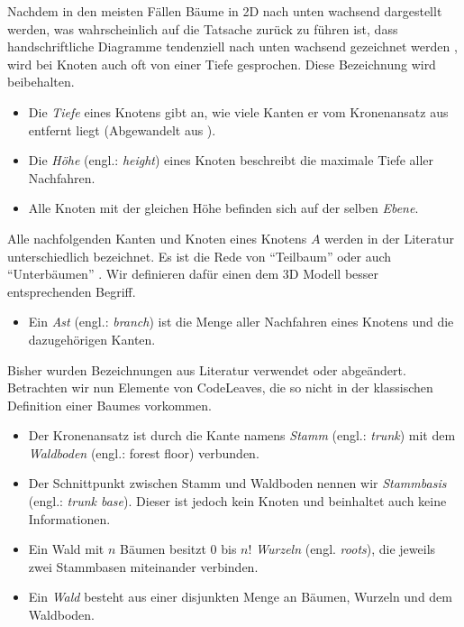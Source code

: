 Nachdem in den meisten Fällen Bäume in 2D nach unten wachsend dargestellt werden, was wahrscheinlich auf die Tatsache zurück zu führen ist, dass handschriftliche Diagramme tendenziell nach unten wachsend gezeichnet werden \cite{knuth1973fundamental}, wird bei Knoten auch oft von einer Tiefe gesprochen. Diese Bezeichnung wird beibehalten.

\begin{itemize}
  \item Die \textit{Tiefe} eines Knotens gibt an, wie viele Kanten er vom Kronenansatz aus entfernt liegt (Abgewandelt aus \cite{ernst2016grundkurs}).
  \item Die \textit{Höhe} (engl.: \textit{height}) eines Knoten beschreibt die maximale Tiefe aller Nachfahren.
  \item Alle Knoten mit der gleichen Höhe befinden sich auf der selben \textit{Ebene}.
\end{itemize}

Alle nachfolgenden Kanten und Knoten eines Knotens $A$ werden in der Literatur unterschiedlich bezeichnet. Es ist die Rede von "`Teilbaum"' \cite{ernst2016grundkurs} oder auch "`Unterbäumen"' \cite{gumm2009einfuehrung}. Wir definieren dafür einen dem 3D Modell besser entsprechenden Begriff.

\begin{itemize}
  \item Ein \textit{Ast} (engl.: \textit{branch}) ist die Menge aller Nachfahren eines Knotens und die dazugehörigen Kanten.
\end{itemize}

Bisher wurden Bezeichnungen aus Literatur verwendet oder abgeändert. Betrachten wir nun Elemente von CodeLeaves, die so nicht in der klassischen Definition einer Baumes vorkommen.

\begin{itemize}
  \item Der Kronenansatz ist durch die Kante namens \textit{Stamm} (engl.: \textit{trunk}) mit dem \textit{Waldboden} (engl.: forest floor) verbunden.
  \item Der Schnittpunkt zwischen Stamm und Waldboden nennen wir \textit{Stammbasis} (engl.: \textit{trunk base}). Dieser ist jedoch kein Knoten und beinhaltet auch keine Informationen.
  \item Ein Wald mit $n$ Bäumen besitzt $0$ bis $n!$ \textit{Wurzeln} (engl. \textit{roots}), die jeweils zwei Stammbasen miteinander verbinden.
  \item Ein \textit{Wald} besteht aus einer disjunkten Menge an Bäumen, Wurzeln und dem Waldboden.
\end{itemize}

